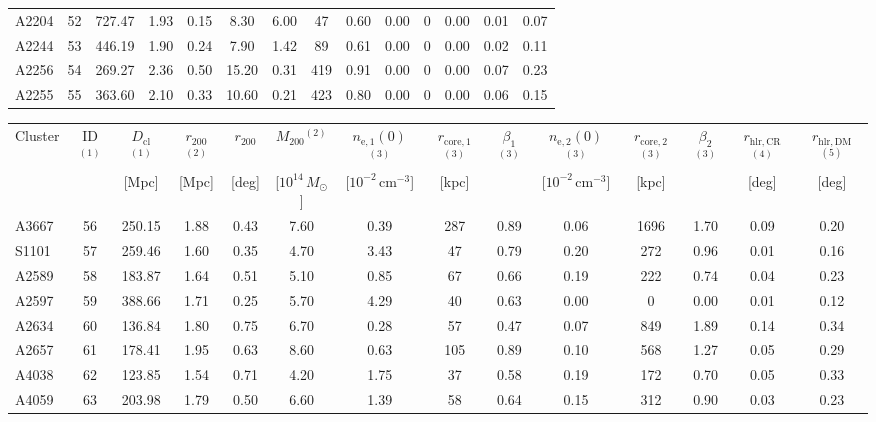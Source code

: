 \documentclass[10pt,aps,pra,reprint,amsmath,amsfonts,amssymb,showpacs,nofootinbib,floatfix]{revtex4-1}
\newcommand{\rmn}{\mathrm}
\newcommand{\clu}{\rmn{cl}}
\newcommand{\msun}{M_\odot}
\newcommand{\vst}{\vspace{-0.14mm}}
\newcommand{\rvir}{r_{200}}
\newcommand{\mvir}{M_{200}}
\begin{document}
\begin{table}
\begin{minipage}{2.0\columnwidth}
\begin{tabular}{l c c c c c c c c c c c c c}
A2204 & 52 & 727.47 & 1.93 & 0.15 & 8.30 & 6.00 & 47 & 0.60 & 0.00 & 0 & 0.00 & 0.01 & 0.07 \vst \\
A2244 & 53 & 446.19 & 1.90 & 0.24 & 7.90 & 1.42 & 89 & 0.61 & 0.00 & 0 & 0.00 & 0.02 & 0.11 \vst \\
A2256 & 54 & 269.27 & 2.36 & 0.50 & 15.20 & 0.31 & 419 & 0.91 & 0.00 & 0 & 0.00 & 0.07 & 0.23 \vst \\
A2255 & 55 & 363.60 & 2.10 & 0.33 & 10.60 & 0.21 & 423 & 0.80 & 0.00 & 0 & 0.00 & 0.06 & 0.15 \vst \\
\end{tabular}
 \label{tab:flux_tab_CLp}
\end{minipage}
\end{table}
\newpage
\begin{table}
\begin{minipage}{2.0\columnwidth}
\begin{tabular}{l c c c c c c c c c c c c c}
\hline
\hline
Cluster & ID$^{(1)}$ & $D_\clu$$^{(1)}$ & $\rvir$$^{(2)}$ & $\rvir$ &
$\mvir$$^{(2)}$ & $n_\rmn{e,1}(0)$$^{(3)}$ & $r_\rmn{core,1}$$^{(3)}$ &
$\beta_1$$^{(3)}$ & $n_\rmn{e,2}(0)$$^{(3)}$ & $r_\rmn{core,2}$$^{(3)}$ &
$\beta_2$$^{(3)}$ & $r_\rmn{hlr,CR}$$^{(4)}$ & $r_\rmn{hlr,DM}$ $^{(5)}$ \\
& & [Mpc] & [Mpc] & [deg] & [$10^{14}\,\msun$]
& [$10^{-2}\,\rmn{cm}^{-3}$] & [kpc] & &
  [$10^{-2}\,\rmn{cm}^{-3}$] & [kpc] & & [deg] & [deg] \\
 \hline
A3667 & 56 & 250.15 & 1.88 & 0.43 & 7.60 & 0.39 & 287 & 0.89 & 0.06 & 1696 & 1.70 & 0.09 & 0.20 \vst \\
S1101 & 57 & 259.46 & 1.60 & 0.35 & 4.70 & 3.43 & 47 & 0.79 & 0.20 & 272 & 0.96 & 0.01 & 0.16 \vst \\
A2589 & 58 & 183.87 & 1.64 & 0.51 & 5.10 & 0.85 & 67 & 0.66 & 0.19 & 222 & 0.74 & 0.04 & 0.23 \vst \\
A2597 & 59 & 388.66 & 1.71 & 0.25 & 5.70 & 4.29 & 40 & 0.63 & 0.00 & 0 & 0.00 & 0.01 & 0.12 \vst \\
A2634 & 60 & 136.84 & 1.80 & 0.75 & 6.70 & 0.28 & 57 & 0.47 & 0.07 & 849 & 1.89 & 0.14 & 0.34 \vst \\
A2657 & 61 & 178.41 & 1.95 & 0.63 & 8.60 & 0.63 & 105 & 0.89 & 0.10 & 568 & 1.27 & 0.05 & 0.29 \vst \\
A4038 & 62 & 123.85 & 1.54 & 0.71 & 4.20 & 1.75 & 37 & 0.58 & 0.19 & 172 & 0.70 & 0.05 & 0.33 \vst \\
A4059 & 63 & 203.98 & 1.79 & 0.50 & 6.60 & 1.39 & 58 & 0.64 & 0.15 & 312 & 0.90 & 0.03 & 0.23 \vst \\

\end{tabular}
\end{minipage}
\end{table}
\end{document}
